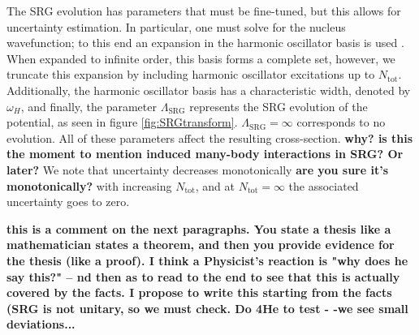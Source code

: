 \documentclass[a4paper,11pt]{article}
\newcommand{\Ntot}{N_{\mathrm{tot}}}
\newcommand{\LamSRG}{\Lambda_{\mathrm{SRG}}}
\newcommand{\com}[1]{\color{blue}\small\textbf{ #1 }\color{black}\normalsize}
\begin{document}
The SRG evolution has parameters that must be fine-tuned, but this
allows for uncertainty estimation.
In particular, one must solve for the nucleus wavefunction; 
to this end an expansion in the harmonic oscillator basis is used .
When expanded to infinite order, this basis forms a complete set,
however, we truncate this expansion by including harmonic oscillator excitations up to $\Ntot$.
Additionally, the harmonic oscillator basis has a characteristic
width, denoted by $\omega_H$, and finally, the parameter $\LamSRG$
represents the SRG evolution of the potential, as seen in figure
\ref{fig:SRGtransform}. $\LamSRG=\infty$ corresponds to no evolution.
All of these parameters affect the resulting cross-section. \com{why? is this the moment to mention induced many-body interactions in SRG? Or later?}
We note that uncertainty decreases monotonically\com{are you sure it's monotonically?} with increasing
$\Ntot$, and at $\Ntot=\infty$ the associated uncertainty goes to zero.

\com{this is a comment on the next paragraphs. You state a thesis like a mathematician states a theorem, and then you provide evidence for the thesis (like a proof). I think a Physicist's reaction is "why does he say this?" -- nd then as to read to the end to see that this is actually covered by the facts. I propose to write this starting from the facts (SRG is not unitary, so we must check. Do 4He to test - -we see small deviations...}
\end{document}
